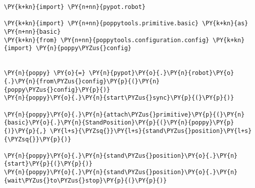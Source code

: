 
\scriptsize
\begin{Verbatim}[commandchars=\\\{\}]
\PY{k+kn}{import} \PY{n+nn}{pypot.robot}

\PY{k+kn}{import} \PY{n+nn}{poppytools.primitive.basic} \PY{k+kn}{as} \PY{n+nn}{basic}
\PY{k+kn}{from} \PY{n+nn}{poppytools.configuration.config} \PY{k+kn}{import} \PY{n}{poppy\PYZus{}config}


\PY{n}{poppy} \PY{o}{=} \PY{n}{pypot}\PY{o}{.}\PY{n}{robot}\PY{o}{.}\PY{n}{from\PYZus{}config}\PY{p}{(}\PY{n}{poppy\PYZus{}config}\PY{p}{)}
\PY{n}{poppy}\PY{o}{.}\PY{n}{start\PYZus{}sync}\PY{p}{(}\PY{p}{)}

\PY{n}{poppy}\PY{o}{.}\PY{n}{attach\PYZus{}primitive}\PY{p}{(}\PY{n}{basic}\PY{o}{.}\PY{n}{StandPosition}\PY{p}{(}\PY{n}{poppy}\PY{p}{)}\PY{p}{,} \PY{l+s}{\PYZsq{}}\PY{l+s}{stand\PYZus{}position}\PY{l+s}{\PYZsq{}}\PY{p}{)}

\PY{n}{poppy}\PY{o}{.}\PY{n}{stand\PYZus{}position}\PY{o}{.}\PY{n}{start}\PY{p}{(}\PY{p}{)}
\PY{n}{poppy}\PY{o}{.}\PY{n}{stand\PYZus{}position}\PY{o}{.}\PY{n}{wait\PYZus{}to\PYZus{}stop}\PY{p}{(}\PY{p}{)}
\end{Verbatim}
